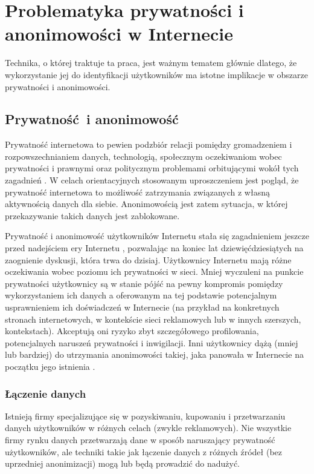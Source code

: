 \chapter{Problematyka prywatności i anonimowości w Internecie}
Technika, o której traktuje ta praca, jest ważnym tematem głównie dlatego, że
wykorzystanie jej do identyfikacji użytkowników ma istotne implikacje w obszarze
prywatności i anonimowości.

\section{Prywatność i anonimowość}
Prywatność internetowa to pewien podzbiór relacji pomiędzy gromadzeniem i
rozpowszechnianiem danych, technologią, społecznym oczekiwaniom wobec
prywatności i prawnymi oraz politycznym problemami orbitującymi wokół tych
zagadnień \cite{michael2014uberveillance}. W celach orientacyjnych stosowanym
uproszczeniem jest pogląd, że prywatność internetowa to możliwość zatrzymania
związanych z własną aktywnością danych dla siebie. Anonimowością jest zatem
sytuacja, w której przekazywanie takich danych jest zablokowane.

Prywatność i anonimowość użytkowników Internetu stała się zagadnieniem jeszcze
przed nadejściem ery Internetu \cite{david1965some}, pozwalając na koniec lat
dziewięćdziesiątych na zaognienie dyskusji, która trwa do dzisiaj. Użytkownicy
Internetu mają różne oczekiwania wobec poziomu ich prywatności w sieci. Mniej
wyczuleni na punkcie prywatności użytkownicy są w stanie pójść na pewny
kompromis pomiędzy wykorzystaniem ich danych a oferowanym na tej podstawie
potencjalnym usprawnieniem ich doświadczeń w Internecie (na przykład na
konkretnych stronach internetowych, w kontekście sieci reklamowych lub w innych
szerszych, kontekstach). Akceptują oni ryzyko zbyt szczegółowego profilowania,
potencjalnych naruszeń prywatności i inwigilacji. Inni użytkownicy dążą (mniej
lub bardziej) do utrzymania anonimowości takiej, jaka panowała w Internecie na
początku jego istnienia \cite[s. 54--69]{snowden2019pamiec}.

\subsection{Łączenie danych}
Istnieją firmy specjalizujące się w pozyskiwaniu, kupowaniu i przetwarzaniu
danych użytkowników w różnych celach (zwykle reklamowych). Nie wszystkie firmy
rynku danych przetwarzają dane w sposób naruszający prywatność użytkowników, ale
techniki takie jak łączenie danych z różnych źródeł (bez uprzedniej
anonimizacji) mogą lub będą prowadzić do nadużyć.

